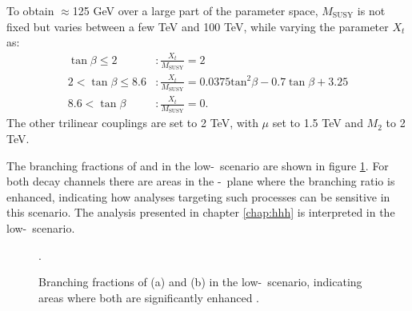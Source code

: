To obtain \mh$\approx$125 GeV over a large part of the parameter
space, 
$M_{\text{SUSY}}$ is not fixed but varies between a few TeV and 100 TeV, while
varying the parameter $X_t$ as:
\begin{equation}
\begin{split}
\tan{\beta} \leq 2 &: \frac{X_t}{M_{\text{SUSY}}} = 2\\
2 < \tan{\beta} \leq 8.6 &: \frac{X_t}{M_{\text{SUSY}}} = 0.0375\text{tan}^2\beta - 0.7\tan{\beta} + 3.25\\
8.6 < \tan{\beta} &: \frac{X_t}{M_{\text{SUSY}}} = 0.
\end{split}
\end{equation}
The other trilinear couplings are set to 2 TeV, with $\mu$ set to 1.5 TeV and $M_2$ to 2 TeV.

The branching fractions of \Htohh and \AtoZh in the low-\tanb~scenario are shown in
figure \ref{fig:lowtbhigh_br}. For both decay channels there are areas in the \mA-\tanb~plane
where the branching ratio is enhanced, indicating how analyses targeting such processes 
can be sensitive in this scenario. %
The analysis presented in chapter \ref{chap:hhh} is interpreted
in the low-\tanb~scenario.

\begin{figure}[h!]
\begin{center}
\end{center}
\caption{Branching fractions of (a) \Htohh and (b) \AtoZh in the low-\tanb~scenario, indicating 
areas where both are significantly enhanced \cite{MSSM-lowtanb}.}
\label{fig:lowtbhigh_br}.
\end{figure}

